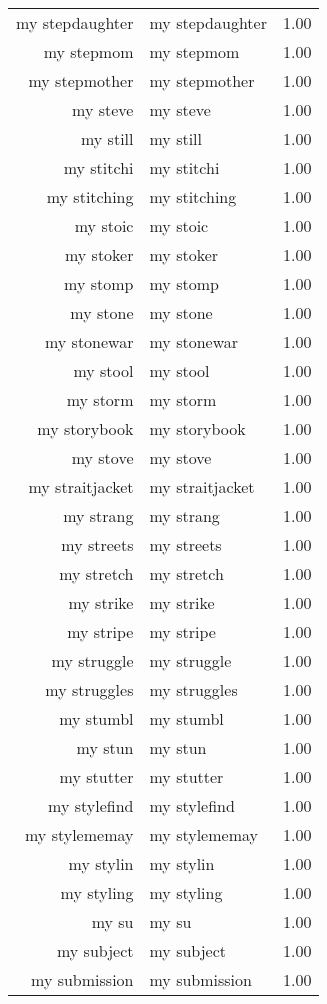 \begin{table}[ht]
\begin{tabular}{rlr}
  my stepdaughter & my stepdaughter & 1.00 \\ 
  my stepmom & my stepmom & 1.00 \\ 
  my stepmother & my stepmother & 1.00 \\ 
  my steve & my steve & 1.00 \\ 
  my still & my still & 1.00 \\ 
  my stitchi & my stitchi & 1.00 \\ 
  my stitching & my stitching & 1.00 \\ 
  my stoic & my stoic & 1.00 \\ 
  my stoker & my stoker & 1.00 \\ 
  my stomp & my stomp & 1.00 \\ 
  my stone & my stone & 1.00 \\ 
  my stonewar & my stonewar & 1.00 \\ 
  my stool & my stool & 1.00 \\ 
  my storm & my storm & 1.00 \\ 
  my storybook & my storybook & 1.00 \\ 
  my stove & my stove & 1.00 \\ 
  my straitjacket & my straitjacket & 1.00 \\ 
  my strang & my strang & 1.00 \\ 
  my streets & my streets & 1.00 \\ 
  my stretch & my stretch & 1.00 \\ 
  my strike & my strike & 1.00 \\ 
  my stripe & my stripe & 1.00 \\ 
  my struggle & my struggle & 1.00 \\ 
  my struggles & my struggles & 1.00 \\ 
  my stumbl & my stumbl & 1.00 \\ 
  my stun & my stun & 1.00 \\ 
  my stutter & my stutter & 1.00 \\ 
  my stylefind & my stylefind & 1.00 \\ 
  my stylememay & my stylememay & 1.00 \\ 
  my stylin & my stylin & 1.00 \\ 
  my styling & my styling & 1.00 \\ 
  my su & my su & 1.00 \\ 
  my subject & my subject & 1.00 \\ 
  my submission & my submission & 1.00 \\ 

\end{tabular}
\end{table}
